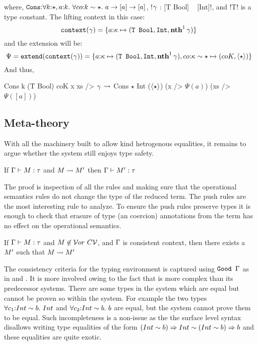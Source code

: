 \documentclass[screen,nonacm,manuscript,review]{acmart} %
\begin{document}
where, $\texttt{Cons} {:} \forall k{:}\star, a{:} k.~\forall co{:} k\sim \star.~a \to [a] \to [a]$,
!$\gamma$ : [T Bool] ~ [Int]!, and !T! is a type constant. The lifting context in this case:
\[\texttt{context}({\gamma}) = \{ a{:}\kappa \mapsto (\texttt{T~Bool}, \texttt{Int}, \textbf{nth}^{1}\,{\gamma})\}\]
and the extension will be:
\[\Psi = \texttt{extend}({\texttt{context}({\gamma})}) = \{a{:}\kappa \mapsto (\texttt{T~Bool}, \texttt{Int}, \textbf{nth}^{1}\,{\gamma}), co{:}\kappa\sim\star \mapsto (coK, \langle{\star}\rangle)\}\]
 And thus,

\begin{CenteredBox}
\begin{code}
    Cons k (T Bool) coK x xs /> $\gamma$
$ \rightsquigarrow $ Cons $\star$ Int ($\langle{\star}\rangle$) (x /> $\Psi(a)$) (xs /> $\Psi([a])$)
\end{code}
\end{CenteredBox}

\subsection{Meta-theory}\label{sfk-meta-theory}
With all the machinery built to allow kind hetrogenous equalities, it remains to argue whether
the system still enjoys type safety.

\begin{theorem}\label{lem:sfk-preservation}
If $\Gamma \vdash M : \tau$  and $M \rightsquigarrow M'$ then $\Gamma \vdash M' : \tau$
\end{theorem}
The proof is inspection of all the rules and making sure that the operational semantics rules
do not change the type of the reduced term. The push rules are the most interesting rule to analyze.
To ensure the push rules preserve types it is enough to check that erasure of type (an coercion) annotations
from the term has no effect on the operational semantics.


\begin{theorem}\label{lem:sfk-progress}
If $\Gamma \vdash M : \tau$ and $M \not\in \mathcal{V} or~ C\mathcal{V}$, and $\Gamma$ is consistent context, then
there exists a $M'$ such that $M \rightsquigarrow M'$
\end{theorem}

The consistency criteria for the typing environment is captured using $\texttt{Good~}\Gamma$ as in \SFP and \SFC. It is
more involved owing to the fact that \SFK is more complex than its predecessor systems.
There are some types in the system which are equal but cannot be proven so within the system.
For example the two types $\forall c_1{:} Int \sim b.~Int$ and $\forall c_2{:} Int \sim b.~b$ are equal,
but the system cannot prove them to be equal. Such incompleteness is a non-issue as the the surface level
syntax disallows writing type equalities of the form $(Int \sim b) \Rightarrow Int \sim (Int \sim b) \Rightarrow b$
and these equalities are quite exotic.
\end{document}
